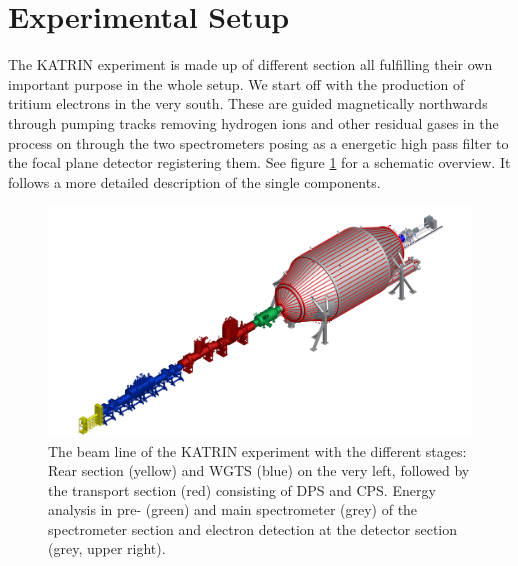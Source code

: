       \section{Experimental Setup}
      \label{ch:The KATRIN experiment:sec:Experimental setup}
      The KATRIN experiment is made up of different section all fulfilling their own important purpose in the whole setup. We start off with the production of tritium electrons in the very south. These are guided magnetically northwards through pumping tracks removing hydrogen ions and other residual gases in the process on through the two spectrometers posing as a energetic high pass filter to the focal plane detector registering them. See figure \ref{fig:beamLine} for a schematic overview. It follows a more detailed description of the single components.
      
      \begin{figure}
			
      		\includegraphics[width = \textwidth]{graphics/katrinExperiment/beamLineHD.jpg}

      	\caption[KATRIN beam line]{The beam line of the KATRIN experiment with the different stages: Rear section (yellow) and WGTS (blue) on the very left, followed by the transport section (red) consisting of DPS and CPS. Energy analysis in pre- (green) and main spectrometer (grey) of the spectrometer section and electron detection at the detector section (grey, upper right).}
      	\label{fig:beamLine}
      \end{figure}

      
